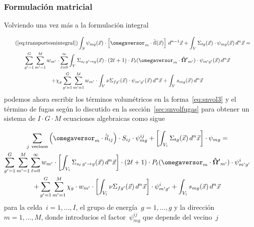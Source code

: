 \subsubsection{Formulación matricial} %

Volviendo una vez más a la formulación integral

\begin{multline}\tag{\ref{eq:transportesnintegral}}
 \int_S \psi_{mg}(\vec{x}) \cdot \left[ \omegaversor_m \cdot \hat{\vec{n}}(\vec{x})\right]  \, d^{n-1}\vec{x}
 +
 \int_V \Sigma_{t g}(\vec{x}) \cdot \psi_{mg}(\vec{x}) \, d^n\vec{x} = \\
 \sum_{g^\prime=1}^G \sum_{m^\prime=1}^M  w_{m^\prime} \cdot  \sum_{\ell=0}^\infty 
\int_V \Sigma_{s_\ell \,g^\prime \rightarrow g}(\vec{x}) \cdot (2\ell+1) \cdot P_\ell (\omegaversor_m \cdot \boldsymbol{\hat{\Omega}^\prime}_{m^\prime}) \cdot \psi_{m^\prime g^\prime}(\vec{x}) \, d^n\vec{x} \\
+
 \chi_g  \sum_{g^\prime=1}^G \sum_{m^\prime=1}^M  w_{m^\prime} \cdot \int_V \nu\Sigma_{fg^\prime}(\vec{x}) \cdot \psi_{m^\prime g^\prime}(\vec{x}) \, d^n\vec{x}
+
 \int_V s_{mg}(\vec{x}) \, d^n\vec{x}
\end{multline}
%
podemos ahora escribir los términos volumétricos en la forma~\eqref{eq:snvol3} y el término de fugas según lo discutido en la sección~\ref{sec:snvolfugas} para obtener un sistema de $I\cdot G\cdot M$ ecuaciones algebraicas como sigue

\begin{multline}\label{eq:snvolalgebraica}
\sum_{j~\text{vecinos}} \left( \omegaversor_m \cdot \hat{\vec{n}}_{ij}\right) \cdot S_{ij} \cdot \psi_{mg}^{ij}
+
 \left[ \int_{V_i} \Sigma_{tg}(\vec{x}) \, d^n\vec{x} \right] \cdot \psi_{mg}
= \\
 \sum_{g^\prime=1}^G \sum_{m^\prime=1}^M  \sum_{\ell=0}^\infty
 w_{m^\prime} \cdot \left[ \int_{V_i} \Sigma_{s_\ell \,g^\prime \rightarrow g}(\vec{x}) \, d^n\vec{x} \right]  \cdot (2\ell+1) \cdot  P_\ell (\omegaversor_m \cdot \boldsymbol{\hat{\Omega}^\prime}_{m^\prime}) \cdot \psi_{m^\prime g^\prime}^i \\
+
 \sum_{g^\prime=1}^G \sum_{m^\prime=1}^M  \chi_g \cdot w_{m^\prime}  \cdot \left[ \int_{V_i} \nu\Sigma_{fg^\prime}(\vec{x}) \, d^n\vec{x} \right] \cdot \psi_{m^\prime g^\prime}^i
+
 \int_{V_i} s_{mg}(\vec{x}) \, d^n\vec{x}
\end{multline}
%
para la celda~$i=1,\dots,I$, el grupo de energía~$g=1,\dots,g$ y la dirección~$m=1,\dots,M$, donde introducios el factor~$\psi_{mg}^{ij}$ que depende del vecino~$j$ 

